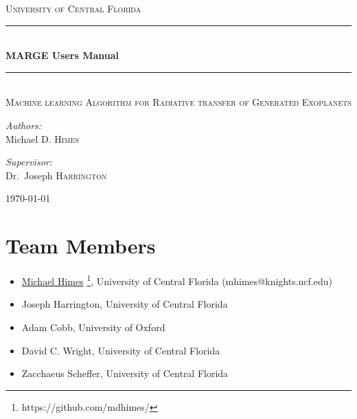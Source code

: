 \documentclass[letterpaper, 12pt]{article}
\begin{document}
\begin{titlepage}
\begin{center}

\textsc{\LARGE University of Central Florida}\\[1.5cm]

\rule{\linewidth}{0.5mm} \\[0.4cm]
{ \huge \bfseries MARGE Users Manual \\[0.4cm] }
\rule{\linewidth}{0.5mm} \\[1.0cm]

\textsc{\Large Machine learning Algorithm for Radiative transfer of Generated Exoplanets}\\[1.5cm]

\noindent
\begin{minipage}{0.4\textwidth}
\begin{flushleft}
\large
\emph{Authors:} \\
Michael D. \textsc{Himes} \\
\end{flushleft}
\end{minipage}%
\begin{minipage}{0.4\textwidth}
\begin{flushright} \large
\emph{Supervisor:} \\
Dr.~Joseph \textsc{Harrington}
\end{flushright}
\end{minipage}
\vfill

{\large \today}

\end{center}
\end{titlepage}

\tableofcontents
\newpage

\section{Team Members}
\label{sec:team}

\begin{itemize}
\item \href{https://github.com/mdhimes/}{Michael Himes}%
  \footnote{https://github.com/mdhimes/}, University of
  Central Florida (mhimes@knights.ucf.edu)
\item Joseph Harrington, University of Central Florida
\item Adam Cobb, University of Oxford
\item David C. Wright, University of Central Florida
\item Zacchaeus Scheffer, University of Central Florida
\end{itemize}
\end{document}
